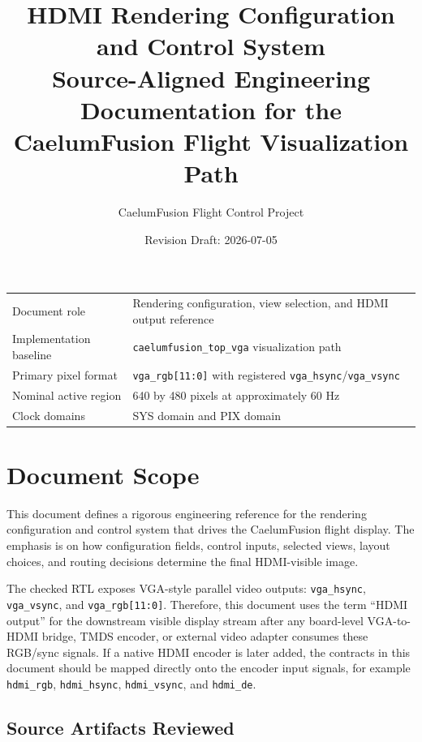 \documentclass[letterpaper, final, onecolumn, titlepage]{article}
\title{\textbf{HDMI Rendering Configuration and Control System}\\
\large Source-Aligned Engineering Documentation for the CaelumFusion Flight Visualization Path}
\author{CaelumFusion Flight Control Project}
\date{Revision Draft: 2026-07-05}
\DeclareRobustCommand{\sig}[1]{\nolinkurl{#1}}
\begin{document}
\begin{titlepage}
\thispagestyle{plain}
\maketitle
\vfill
\begin{center}
\begin{tabular}{ll}
\toprule
Document role & Rendering configuration, view selection, and HDMI output reference \\
Implementation baseline & \sig{caelumfusion_top_vga} visualization path \\
Primary pixel format & \sig{vga_rgb[11:0]} with registered \sig{vga_hsync}/\sig{vga_vsync} \\
Nominal active region & 640 by 480 pixels at approximately 60 Hz \\
Clock domains & SYS domain and PIX domain \\
\bottomrule
\end{tabular}
\end{center}
\vfill
\end{titlepage}

\tableofcontents
\listoffigures
\listoftables
\clearpage

\section{Document Scope}

This document defines a rigorous engineering reference for the rendering
configuration and control system that drives the CaelumFusion flight display.
The emphasis is on how configuration fields, control inputs, selected views,
layout choices, and routing decisions determine the final HDMI-visible image.

The checked RTL exposes VGA-style parallel video outputs:
\sig{vga_hsync}, \sig{vga_vsync}, and \sig{vga_rgb[11:0]}. Therefore, this
document uses the term ``HDMI output'' for the downstream visible display
stream after any board-level VGA-to-HDMI bridge, TMDS encoder, or external video
adapter consumes these RGB/sync signals. If a native HDMI encoder is later added,
the contracts in this document should be mapped directly onto the encoder input
signals, for example \sig{hdmi_rgb}, \sig{hdmi_hsync}, \sig{hdmi_vsync}, and
\sig{hdmi_de}.

\subsection{Source Artifacts Reviewed}
\end{document}
